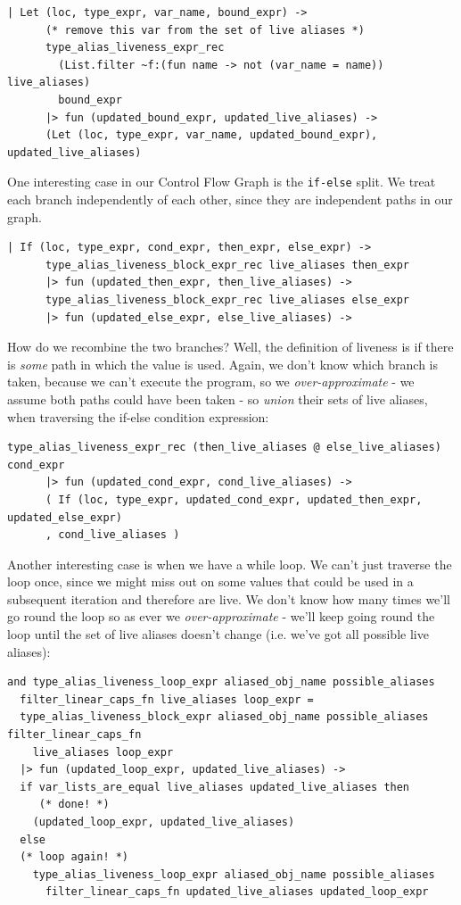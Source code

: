 \begin{lstlisting}[language=caml]
| Let (loc, type_expr, var_name, bound_expr) ->
      (* remove this var from the set of live aliases *)
      type_alias_liveness_expr_rec
        (List.filter ~f:(fun name -> not (var_name = name)) live_aliases)
        bound_expr
      |> fun (updated_bound_expr, updated_live_aliases) ->
      (Let (loc, type_expr, var_name, updated_bound_expr), updated_live_aliases)
\end{lstlisting}


One interesting case in our Control Flow Graph is the \texttt{if-else}
split. We treat each branch independently of each other, since they are
independent paths in our graph.

\begin{lstlisting}[language=caml]
| If (loc, type_expr, cond_expr, then_expr, else_expr) ->
      type_alias_liveness_block_expr_rec live_aliases then_expr
      |> fun (updated_then_expr, then_live_aliases) ->
      type_alias_liveness_block_expr_rec live_aliases else_expr
      |> fun (updated_else_expr, else_live_aliases) ->
\end{lstlisting}

How do we recombine the two branches? Well, the definition of liveness
is if there is \emph{some} path in which the value is used. Again, we
don't know which branch is taken, because we can't execute the program,
so we \emph{over-approximate} - we assume both paths could have been
taken - so \emph{union} their sets of live aliases, when traversing the
if-else condition expression:

\begin{lstlisting}[language=caml]
type_alias_liveness_expr_rec (then_live_aliases @ else_live_aliases) cond_expr
      |> fun (updated_cond_expr, cond_live_aliases) ->
      ( If (loc, type_expr, updated_cond_expr, updated_then_expr, updated_else_expr)
      , cond_live_aliases )
\end{lstlisting}

Another interesting case is when we have a while loop. We can't just
traverse the loop once, since we might miss out on some values that
could be used in a subsequent iteration and therefore are live. We don't
know how many times we'll go round the loop so as ever we
\emph{over-approximate} - we'll keep going round the loop until the set
of live aliases doesn't change (i.e. we've got all possible live
aliases):
\begin{lstlisting}[language=caml]
and type_alias_liveness_loop_expr aliased_obj_name possible_aliases
  filter_linear_caps_fn live_aliases loop_expr =
  type_alias_liveness_block_expr aliased_obj_name possible_aliases filter_linear_caps_fn
    live_aliases loop_expr
  |> fun (updated_loop_expr, updated_live_aliases) ->
  if var_lists_are_equal live_aliases updated_live_aliases then
     (* done! *)
    (updated_loop_expr, updated_live_aliases)
  else
  (* loop again! *)
    type_alias_liveness_loop_expr aliased_obj_name possible_aliases
      filter_linear_caps_fn updated_live_aliases updated_loop_expr
\end{lstlisting}


